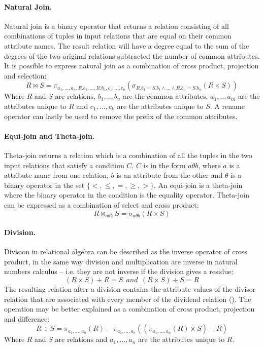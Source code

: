 \paragraph{Natural Join.}
Natural join is a binary operator that returns a relation consisting of all combinations of tuples in input relations that are equal on their common attribute names. The result relation will have a degree equal to the sum of the degrees of the two original relations subtracted the number of common attributes. It is possible to express natural join as a combination of cross product, projection and selection:
\begin{equation*}
R \bowtie S = \pi_{a_{1},..., a_{n},R.b_{1},...,R.b_{n},c_{1},...,c_{n}}( \sigma _{R.b_{1}=S.b_{1} \wedge ... \wedge R.b_{n}=S.b_{n}}(R \times S))
\end{equation*}
Where $R$ and $S$ are relations, $b_{1},..,b_{n}$ are the common attributes, $a_{1},..,a_{m}$ are the attributes unique to $R$ and $c_{1},...,c_{k}$ are the attributes unique to $S$. A rename operator can lastly be used to remove the prefix of the common attributes.
\paragraph{Equi-join and Theta-join.}
Theta-join returns a relation which is a combination of all the tuples in the two input relations that satisfy a condition $C$. $C$ is in the form $a \theta b$, where $a$ is a attribute name from one relation, $b$ is an attribute from the other and $ \theta $ is a binary operator in the set $ \{ <, \leq , =, \geq , >  \} $. An equi-join is a theta-join where the binary operator in the condition is the equality operator. Theta-join can be expressed as a combination of select and cross product:
\begin{equation*}
R \bowtie _{a \theta b}S = \sigma _{a \theta b}(R \times S)
\end{equation*}
\paragraph{Division.}
Division in relational algebra can be described as the inverse operator of cross product, in the same way division and multiplication are inverse in natural numbers calculus -- i.e. they are not inverse if the division gives a residue:
\begin{equation*}
(R \times S) \div R = S ~~and~~ (R \times S) \div S = R
\end{equation*}
The resulting relation after a division contains the attribute values of the divisor relation that are associated with every member of the dividend relation (\cite{makeDiv}). The operation may be better explained as a combination of cross product, projection and difference:
\begin{equation*}
R \div S = \pi _{a_{1},...,a_{n}}(R) - \pi _{a_{1},...,a_{n}}((\pi _{a_{1},...,a_{n}}(R) \times S) - R)
\end{equation*}
Where $R$ and $S$ are relations and $a_{1},...,a_{n}$ are the attributes unique to $R$.
